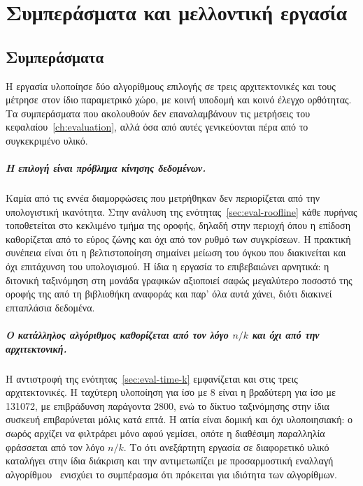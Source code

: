 \chapter{Συμπεράσματα και μελλοντική εργασία}
\label{ch:conclusions}

\section{Συμπεράσματα}
\label{sec:concl-summary}

Η εργασία υλοποίησε δύο αλγορίθμους επιλογής  σε τρεις αρχιτεκτονικές
και τους μέτρησε στον ίδιο παραμετρικό χώρο, με κοινή υποδομή και κοινό έλεγχο
ορθότητας. Τα συμπεράσματα που ακολουθούν δεν επαναλαμβάνουν τις μετρήσεις του
κεφαλαίου~\ref{ch:evaluation}, αλλά όσα από αυτές γενικεύονται πέρα από το
συγκεκριμένο υλικό.

\paragraph{Η επιλογή  είναι πρόβλημα κίνησης δεδομένων.}
Καμία από τις εννέα διαμορφώσεις που μετρήθηκαν δεν περιορίζεται από την
υπολογιστική ικανότητα. Στην ανάλυση της ενότητας~\ref{sec:eval-roofline} κάθε
πυρήνας τοποθετείται στο κεκλιμένο τμήμα της οροφής, δηλαδή στην περιοχή όπου η
επίδοση καθορίζεται από το εύρος ζώνης και όχι από τον ρυθμό των συγκρίσεων. Η
πρακτική συνέπεια είναι ότι η βελτιστοποίηση σημαίνει μείωση του όγκου που
διακινείται και όχι επιτάχυνση του υπολογισμού. Η ίδια η εργασία το επιβεβαιώνει
αρνητικά: η διτονική ταξινόμηση στη μονάδα γραφικών αξιοποιεί σαφώς μεγαλύτερο
ποσοστό της οροφής της από τη βιβλιοθήκη αναφοράς και παρ' όλα αυτά χάνει, διότι
διακινεί επταπλάσια δεδομένα.

\paragraph{Ο κατάλληλος αλγόριθμος καθορίζεται από τον λόγο $n/k$ και όχι από την
αρχιτεκτονική.} Η αντιστροφή της ενότητας~\ref{sec:eval-time-k} εμφανίζεται και
στις τρεις αρχιτεκτονικές. Η ταχύτερη υλοποίηση για  ίσο με 8 είναι η
βραδύτερη για  ίσο με 131072, με επιβράδυνση παράγοντα 2800, ενώ το δίκτυο
ταξινόμησης στην ίδια συσκευή επιβαρύνεται μόλις κατά επτά. Η αιτία είναι δομική
και όχι υλοποιησιακή: ο σωρός αρχίζει να φιλτράρει μόνο αφού γεμίσει, οπότε η
διαθέσιμη παραλληλία φράσσεται από τον λόγο $n/k$. Το ότι ανεξάρτητη εργασία σε
διαφορετικό υλικό καταλήγει στην ίδια διάκριση και την αντιμετωπίζει με
προσαρμοστική εναλλαγή αλγορίθμου~\cite{lin2026adaptivetopk} ενισχύει το
συμπέρασμα ότι πρόκειται για ιδιότητα των αλγορίθμων.

